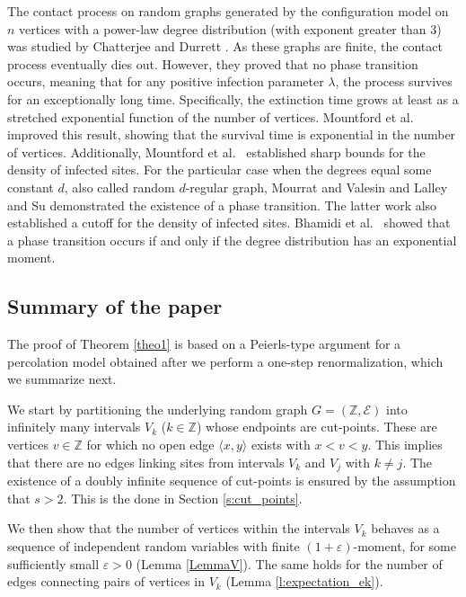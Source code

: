 \documentclass[a4paper,oneside,12pt]{amsart}
\theoremstyle{plain}
\theoremstyle{definition}
\theoremstyle{remark}
\begin{document}
The contact process on random graphs generated by the configuration model on $n$ vertices with a power-law degree distribution (with exponent greater than 3) was studied by Chatterjee and Durrett \cite{ChatterjeeDurrett2009}. 
As these graphs are finite, the contact process eventually dies out. 
However, they proved that no phase transition occurs, meaning that for any positive infection parameter $\lambda$, the process survives for an exceptionally long time. 
Specifically, the extinction time grows at least as a stretched exponential function of the number of vertices. 
Mountford et al. \cite{Mountford2016} improved this result, showing that the survival time is exponential in the number of vertices. 
Additionally, Mountford et al.\ \cite{MountfordValesinYao2013} established sharp bounds for the density of infected sites.
For the particular case when the degrees equal some constant $d$, also called random $d$-regular graph, Mourrat and Valesin \cite{Mourrat2016} and Lalley and Su \cite{Lalley2017} demonstrated the existence of a phase transition. 
The latter work also established a cutoff for the density of infected sites.
Bhamidi et al.\ \cite{Bhamidi2021} showed that a phase transition occurs if and only if the degree distribution has an exponential moment.

\subsection{Summary of the paper}

The proof of Theorem \ref{theo1} is based on a Peierls-type argument for a percolation model obtained after we perform a one-step renormalization, which we summarize next.
\medskip

We start by partitioning the underlying random graph $G=(\mathbb{Z}, \mathcal{E})$ into infinitely many intervals $V_k$ ($k\in\mathbb{Z}$) whose endpoints are cut-points.
These are vertices $v\in\mathbb{Z}$ for which no open edge $\langle x,y \rangle$ exists with $x < v < y$.
This implies that there are no edges linking sites from intervals $V_k$ and $V_j$ with $k \neq j$.
The existence of a doubly infinite sequence of cut-points is ensured by the assumption that $s > 2$.
This is the done in Section \ref{s:cut_points}.
\medskip

We then show that the number of vertices within the intervals $V_k$ behaves as a sequence of independent random variables with finite $(1+\varepsilon)$-moment, for some sufficiently small $\varepsilon>0$ (Lemma \ref{LemmaV}).
The same holds for the number of edges connecting pairs of vertices in $V_k$ (Lemma \ref{l:expectation_ek}).
\medskip
\end{document}
